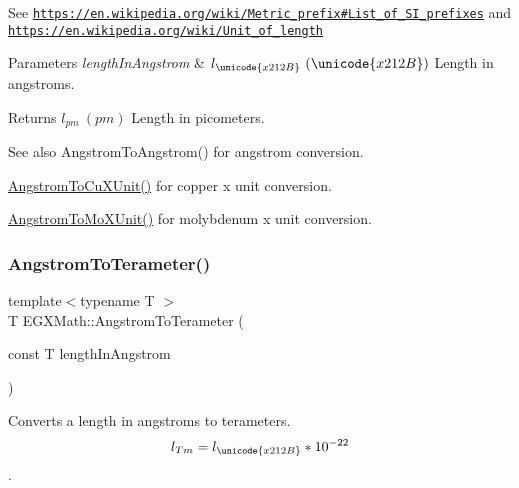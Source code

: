 See \href{https://en.wikipedia.org/wiki/Metric_prefix#List_of_SI_prefixes}{\tt https\+://en.\+wikipedia.\+org/wiki/\+Metric\+\_\+prefix\#\+List\+\_\+of\+\_\+\+S\+I\+\_\+prefixes} and \href{https://en.wikipedia.org/wiki/Unit_of_length}{\tt https\+://en.\+wikipedia.\+org/wiki/\+Unit\+\_\+of\+\_\+length} 
\begin{DoxyParams}{Parameters}
{\em length\+In\+Angstrom} & $ l_{\unicode{x212B}}\ (\unicode{x212B})$ Length in angstroms. \\
\hline
\end{DoxyParams}
\begin{DoxyReturn}{Returns}
$ l_{pm}\ (pm)$ Length in picometers. 
\end{DoxyReturn}
\begin{DoxySeeAlso}{See also}
Angstrom\+To\+Angstrom() for angstrom conversion. 

\mbox{\hyperlink{group___e_g_x_math-_conversions-_length_conversions-_non-_s_i-_angstrom-_non-_s_i_gaf42d486942a8441d13065d8e13661ec6}{Angstrom\+To\+Cu\+X\+Unit()}} for copper x unit conversion. 

\mbox{\hyperlink{group___e_g_x_math-_conversions-_length_conversions-_non-_s_i-_angstrom-_non-_s_i_ga197c8294d73fcc3171cd05fc595816c4}{Angstrom\+To\+Mo\+X\+Unit()}} for molybdenum x unit conversion. 
\end{DoxySeeAlso}
\mbox{\label{group___e_g_x_math-_conversions-_length_conversions-_non-_s_i-_angstrom-_s_i_ga4571315b1da0976784c024a676ebfa43}} 
\subsubsection{\texorpdfstring{Angstrom\+To\+Terameter()}{AngstromToTerameter()}}
{\footnotesize\ttfamily template$<$typename T $>$ \\
T E\+G\+X\+Math\+::\+Angstrom\+To\+Terameter (\begin{DoxyParamCaption}\item[{const T}]{length\+In\+Angstrom }\end{DoxyParamCaption})}



Converts a length in angstroms to terameters. \[ l_{Tm}=l_{\unicode{x212B}} * 10^{-22} \]. 

